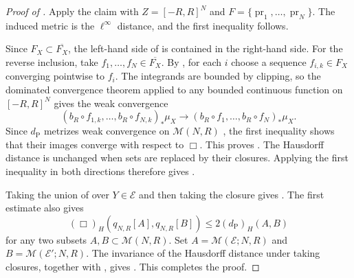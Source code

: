 \documentclass{amsart}
\theoremstyle{plain}
\theoremstyle{definition}
\theoremstyle{remark}
\newcommand{\M}{\mathcal{M}}
\DeclareMathOperator{\pr}{pr}
\newcommand{\dpr}{d_{\operatorname{P}}}
\newcommand{\haus}[1]{\left(#1\right)_H}
\begin{document}
\begin{proof}[Proof of ]
Apply the claim with $Z=[-R,R]^N$ and $F=\{\pr_1,\ldots,\pr_N\}$. The induced metric is the $\ell^\infty$ distance, and the first inequality follows.

Since $F_X\subset\overline{F_X}$, the left-hand side of  is contained in the right-hand side. For the reverse inclusion, take $f_1,\ldots,f_N\in\overline{F_X}$. By , for each $i$ choose a sequence $f_{i,k}\in F_X$ converging pointwise to $f_i$. The integrands are bounded by clipping, so the dominated convergence theorem applied to any bounded continuous function on $[-R,R]^N$ gives the weak convergence
\[
(b_R\circ f_{1,k},\ldots,b_R\circ f_{N,k})_*\mu_X
\longrightarrow
(b_R\circ f_1,\ldots,b_R\circ f_N)_*\mu_X.
\]
Since $\dpr$ metrizes weak convergence on $\M(N,R)$ \cite[Lemma~1.17(1)]{shioya2016mmg}, the first inequality shows that their images converge with respect to $\Box$. This proves . The Hausdorff distance is unchanged when sets are replaced by their closures. Applying the first inequality in both directions therefore gives .

Taking the union of  over $Y\in\mathcal E$ and then taking the closure gives . The first estimate also gives
\[\haus{\Box}(q_{N,R}[A],q_{N,R}[B])\leq2\haus{\dpr}(A,B)\]
for any two subsets $A,B\subset\M(N,R)$. Set $A=\M(\mathcal E;N,R)$ and $B=\M(\mathcal E';N,R)$. The invariance of the Hausdorff distance under taking closures, together with , gives . This completes the proof.
\end{proof}
\end{document}
